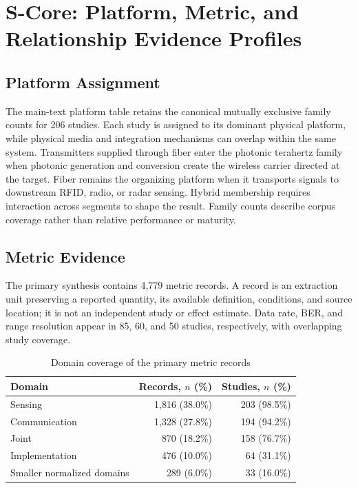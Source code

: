 \section{S-Core: Platform, Metric, and Relationship Evidence Profiles}
\label{supp:core}

\subsection{Platform Assignment}

The main-text platform table retains the canonical mutually exclusive family
counts for 206 studies. Each study is assigned to its dominant physical
platform, while physical media and integration mechanisms can overlap within
the same system. Transmitters supplied through fiber enter the photonic
terahertz family when photonic generation and conversion create the wireless
carrier directed at the target. Fiber remains the organizing platform when it
transports signals to downstream RFID, radio, or radar sensing. Hybrid
membership requires interaction across segments to shape the result. Family
counts describe corpus coverage rather than relative performance or maturity.

\subsection{Metric Evidence}

The primary synthesis contains 4,779 metric records. A record is an extraction
unit preserving a reported quantity, its available definition, conditions, and
source location; it is not an independent study or effect estimate. Data rate,
BER, and range resolution appear in 85, 60, and 50 studies, respectively, with
overlapping study coverage.

\begin{table}[htbp]
\caption{Domain coverage of the primary metric records}
\label{tab:s_metric_domains}
\centering
\footnotesize
\setlength{\tabcolsep}{4pt}
\begin{tabular}{@{}lrr@{}}
\toprule
Domain & Records, $n$ (\%) & Studies, $n$ (\%) \\
\midrule
Sensing & 1,816 (38.0\%) & 203 (98.5\%) \\
Communication & 1,328 (27.8\%) & 194 (94.2\%) \\
Joint & 870 (18.2\%) & 158 (76.7\%) \\
Implementation & 476 (10.0\%) & 64 (31.1\%) \\
Smaller normalized domains & 289 (6.0\%) & 33 (16.0\%) \\
\bottomrule
\end{tabular}
\end{table}


